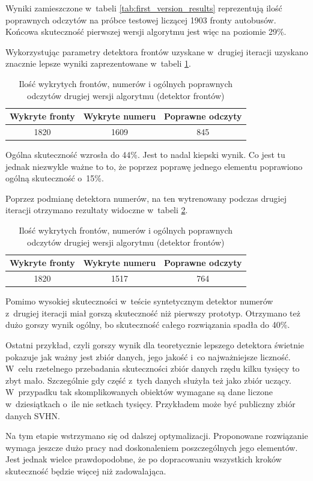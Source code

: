 Wyniki zamieszczone w~tabeli \ref{tab:first_version_results}
reprezentują ilość poprawnych odczytów na próbce testowej
liczącej 1903 fronty autobusów. Końcowa skuteczność
pierwszej wersji algorytmu jest więc na poziomie 29\%.

Wykorzystując parametry detektora frontów uzyskane w~drugiej
iteracji uzyskano znacznie lepsze wyniki zaprezentowane w~tabeli
\ref{tab:second_version_results}.

\begin{table}[!h]
    \centering
    \begin{tabular}{c|c|c}
        Wykryte fronty  & Wykryte numeru & Poprawne odczyty \\ \hline
        1820 & 1609 & 845
    \end{tabular}
    \caption{Ilość wykrytych frontów, numerów i ogólnych poprawnych 
    odczytów drugiej wersji algorytmu (detektor frontów)}
    \label{tab:second_version_results}
\end{table}

Ogólna skuteczność wzrosła do 44\%. Jest to nadal kiepski wynik.
Co jest tu jednak niezwykle ważne to to, że 
poprzez poprawę jednego elementu
poprawiono ogólną skuteczność o~15\%.

Poprzez podmianę detektora numerów, na ten wytrenowany 
podczas drugiej iteracji otrzymano rezultaty widoczne
w~tabeli \ref{tab:upset_second_version_number_detector}.

\begin{table}[!h]
    \centering
    \begin{tabular}{c|c|c}
        Wykryte fronty  & Wykryte numeru & Poprawne odczyty \\ \hline
        1820 & 1517 & 764 
    \end{tabular}
    \caption{Ilość wykrytych frontów, numerów i ogólnych poprawnych 
    odczytów drugiej wersji algorytmu (detektor frontów)}
    \label{tab:upset_second_version_number_detector}
\end{table}

Pomimo wysokiej skuteczności w~teście syntetycznym
detektor numerów z~drugiej iteracji miał gorszą skuteczność
niż pierwszy prototyp. Otrzymano też dużo gorszy wynik
ogólny, bo skuteczność całego rozwiązania spadła do
40\%.

Ostatni przykład, czyli gorszy wynik dla teoretycznie 
lepszego detektora świetnie pokazuje jak ważny jest zbiór
danych, jego jakość i~co najważniejsze liczność. 
W~celu rzetelnego przebadania skuteczności zbiór danych 
rzędu kilku tysięcy to zbyt mało. Szczególnie gdy część 
z~tych danych służyła też jako zbiór uczący.
W~przypadku tak skomplikowanych obiektów wymagane są 
dane liczone w~dziesiątkach o~ile nie setkach tysięcy.
Przykładem może być publiczny zbiór danych SVHN.

Na tym etapie wstrzymano się od dalszej optymalizacji. 
Proponowane rozwiązanie wymaga jeszcze dużo pracy nad 
doskonaleniem poszczególnych jego elementów.
Jest jednak wielce prawdopodobne, że po dopracowaniu 
wszystkich kroków skuteczność będzie więcej niż zadowalająca.
